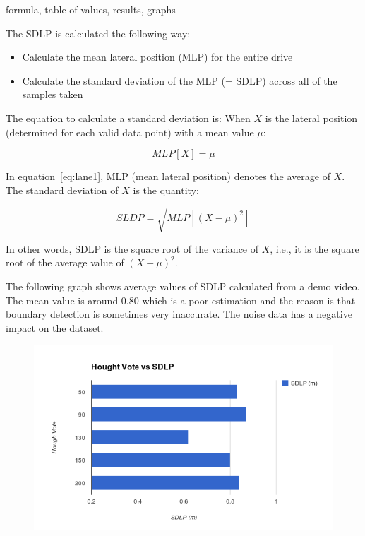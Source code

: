 formula, table of values, results, graphs

The SDLP is calculated the following way:

\begin{itemize}
    \item Calculate the mean lateral position (MLP) for the entire drive 
    \item Calculate the standard deviation of the MLP (= SDLP) across all of the samples taken
\end{itemize}

The equation to calculate a standard deviation is:
When $X$ is the lateral position (determined for each valid data point) with a
mean value $\mu$:

\begin{equation}
    MLP[X] = \mu
    \label{eq:lane1}
\end{equation}

In equation~\ref{eq:lane1}, MLP (mean lateral position) denotes the average of
$X$. The standard deviation of $X$ is the quantity:

\begin{equation}
    SLDP = \sqrt{MLP[(X - \mu)^2]}
\end{equation}

In other words, SDLP is the square root of the variance of $X$, i.e., it is the
square root of the average value of $(X - \mu)^2$.

The following graph shows average values of SDLP calculated from a demo video. The mean value is around 0.80 which is a poor estimation and the reason is that boundary detection is sometimes very inaccurate. The noise data has a negative impact on the dataset. 


\begin{figure}
\begin{center}
    \includegraphics[scale=0.6]{img/lane11.png}
\end{center}
\label{fig:lane11}
\end{figure}

